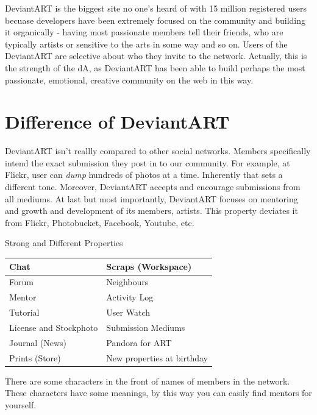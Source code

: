 \documentclass[12pt,a4paper]{report}
\begin{document}
	\par DeviantART is the biggest site no one's heard of with 15 million registered users becuase developers have been extremely focused on the community and building it organically - having most passionate members tell their friends, who are typically artists or sensitive to the arts in some way and so on. Users of the DeviantART are selective about who they invite to the network. Actually, this is the strength of the dA, as DeviantART has been able to build perhaps the most passionate, emotional, creative community on the web in this way.

	\clearpage

	\section{Difference of DeviantART}

	\par DeviantART isn't reallly compared to other social networks. Members specifically intend the exact submission they post in to our community. For example, at Flickr, user can \emph{dump} hundreds of photos at a time. Inherently that sets a different tone. Moreover, DeviantART accepts and encourage submissions from all mediums. At last but most importantly, DeviantART focuses on mentoring and growth and development of its members, artists. This property deviates it from Flickr, Photobucket, Facebook, Youtube, etc.

	\begin{table}[htdp]
	\begin{center}
	\textup{\Large Strong and Different Properties} 
	\begin{tabular}{|p{6.5cm}|p{6.5cm}|}
	\hline
	Chat & Scraps (Workspace)\\
	\hline
	Forum & Neighbours\\
	\hline
	Mentor & Activity Log \\
	\hline
	Tutorial & User Watch\\
	\hline
	License and Stockphoto &Submission Mediums\\
	\hline
	Journal (News) & Pandora for ART\\
	\hline
	Prints (Store) & New properties at birthday\\
	\hline
	\end{tabular}
	\end{center}
	\end{table} 

	\par There are some characters in the front of names of members in the network. These characters have some meanings, by this way you can easily find mentors for yourself.
\end{document}
